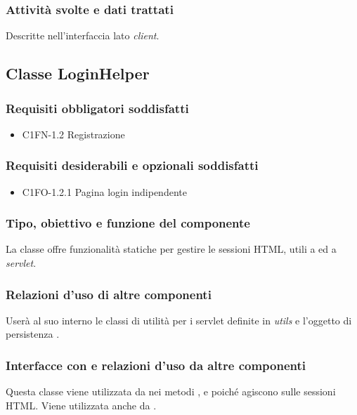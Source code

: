 \subsubsection*{Attivit\`a svolte e dati trattati}
Descritte nell'interfaccia lato \emph{client}.


\subsection{Classe LoginHelper}
\subsubsection*{Requisiti obbligatori soddisfatti}
\begin{itemize}
    \item C1FN-1.2 Registrazione
\end{itemize}
\subsubsection*{Requisiti desiderabili e opzionali soddisfatti}
\begin{itemize}
    \item C1FO-1.2.1 Pagina login indipendente
\end{itemize}
\subsubsection*{Tipo, obiettivo e funzione del componente}
La classe  offre funzionalit\`a statiche
per gestire le sessioni HTML, utili a  ed a
\emph{servlet}.
\subsubsection*{Relazioni d'uso di altre componenti}
User\`a al suo interno le classi di utilit\`a per i servlet definite in
\emph{utils} e l'oggetto di persistenza .
\subsubsection*{Interfacce con e relazioni d'uso da altre componenti}
Questa classe viene utilizzata da  nei metodi ,
 e  poich\'e agiscono sulle sessioni HTML.
Viene utilizzata anche da .
